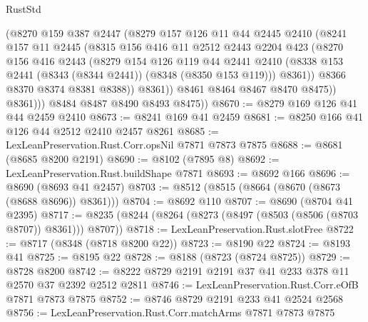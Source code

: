 \begin{lexlean}{RustStd}
\begin{coremodule}
{\begin{coremodule}
{{{{{{{{{{{{{{{{{{{{{{{{{{{{{{{{{{{{{{{{{{{{{{{{{{                  (@8270
                    @159
                    @387
                    @2447
                    (@8279
                      @157
                      @126
                      @11
                      @44
                      @2445
                      @2410
                      (@8241
                        @157
                        @11
                        @2445
                        (@8315
                          @156
                          @416
                          @11
                          @2512
                          @2443
                          @2204
                          @423
                          (@8270
                            @156
                            @416
                            @2443
                            (@8279
                              @154
                              @126
                              @119
                              @44
                              @2441
                              @2410
                              (@8338 @153 @2441 (@8343 (@8344 @2441)) (@8348 (@8350 @153 @119)))
                              @8361))
                          @8366
                          @8370
                          @8374
                          @8381
                          @8388))
                      @8361))
                  @8461
                  @8464
                  @8467
                  @8470
                  @8475))
              @8361)))
        @8484
        @8487
        @8490
        @8493
        @8475))
@8670 := @8279 @169 @126 @41 @44 @2459 @2410
@8673 := @8241 @169 @41 @2459
@8681 := @8250 @166 @41 @126 @44 @2512 @2410 @2457 @8261
@8685 := LexLeanPreservation.Rust.Corr.opsNil @7871 @7873 @7875
@8688 := @8681 (@8685 @8200 @2191)
@8690 := @8102 (@7895 @8)
@8692 := LexLeanPreservation.Rust.buildShape @7871
@8693 := @8692 @166
@8696 := @8690 (@8693 @41 @2457)
@8703 := @8512 (@8515 (@8664 (@8670 (@8673 (@8688 @8696)) @8361)))
@8704 := @8692 @110
@8707 := @8690 (@8704 @41 @2395)
@8717 := @8235 (@8244 (@8264 (@8273 (@8497 (@8503 (@8506 (@8703 @8707)) @8361))) @8707))
@8718 := LexLeanPreservation.Rust.slotFree
@8722 := @8717 (@8348 (@8718 @8200 @22))
@8723 := @8190 @22
@8724 := @8193 @41
@8725 := @8195 @22
@8728 := @8188 (@8723 (@8724 @8725))
@8729 := @8728 @8200
@8742 := @8222 @8729 @2191 @2191 @37 @41 @233 @378 @11 @2570 @37 @2392 @2512 @2811
@8746 := LexLeanPreservation.Rust.Corr.eOfB @7871 @7873 @7875
@8752 := @8746 @8729 @2191 @233 @41 @2524 @2568
@8756 := LexLeanPreservation.Rust.Corr.matchArms @7871 @7873 @7875
}}}}}}}}}}}}}}}}}}}}}}}}}}}}}}}}}}}}}}}}}}}}}}}}}}
\end{coremodule}}
\end{coremodule}
\end{lexlean}
